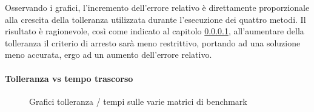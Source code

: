 Osservando i grafici, l'incremento dell'errore relativo è direttamente proporzionale alla crescita della tolleranza utilizzata durante l'esecuzione dei quattro metodi. Il risultato è ragionevole, così come indicato al capitolo \ref{tol/time, diff methods}, all'aumentare della tolleranza il criterio di arresto sarà meno restrittivo, portando ad una soluzione meno accurata, ergo ad un aumento dell'errore relativo.

\paragraph{Tolleranza vs tempo trascorso}\label{tol/time, diff methods}


\begin{figure}%
	\centering
	\qquad
	\caption{Grafici tolleranza / tempi sulle varie matrici di benchmark}%
	\label{fig:toltimemat}
\end{figure}

